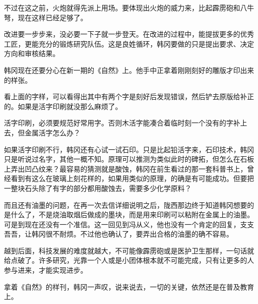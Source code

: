 不过在这之前，火炮就得先派上用场。要体现出火炮的威力来，比起霹雳砲和八牛弩，现在这样已经足够了。

改进要一步步来，没必要一下子就一步登天。在改进的过程中，能提拔更多的优秀工匠，更能充分的锻炼研究队伍。这是良姓循环，韩冈要做的只是提出要求、决定方向和审核结果。

韩冈现在还要分心在新一期的《自然》上。他手中正拿着刚刚刻好的雕版才印出来的样张。

看上面的字样，可以看得出其中有两个字是刻好后发现错误，然后铲去原版给补正的。如果是活字印刷就没那么麻烦了。

活字印刷，必须要规范好常用字。否则木活字能凑合着临时刻一个没有的字补上去，但金属活字怎么办？

如果活字印刷不行，韩冈还有心试一试石印。只是比起铅活字来，石印技术，韩冈只是听说过名字，其他一概不知。原理可以推测为类似此时的碑拓，但怎么在石板上弄出凹凸纹来？最容易的猜测就是酸蚀，韩冈在前生看过的那一套科普书上，曾经看到有这么在玻璃上刻花样的，如果用类似的原理，的确是有可能成功。但要把一整块石头除了有字的部分都用酸蚀去，需要多少化学原料？

而且还有油墨的问题，在再一次去信详细说明之后，陇西那边终于知道韩冈想要的是什么了，不是烧油取烟后做成的墨块，而是用来印刷可以粘附在金属上的油墨。可是到现在还没有一个准信。这一回见到冯从义，他也没有一个肯定的回复，支支吾吾，让韩冈很不耐烦。不过他也确认了，要弄出合格的油墨的确不容易。

越到后面，科技发展的难度就越大，不可能像霹雳砲或是医护卫生那样，一句话就给点破了。许多研究，光靠一个人或是小团体根本就不可能完成，只有让更多的人参与进来，才能实现进步。

拿着《自然》的样刊，韩冈一声叹，说来说去，一切的关键，依然还是在普及教育上。

